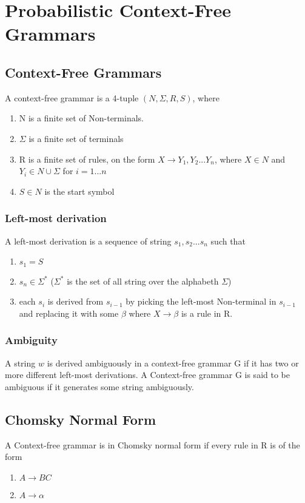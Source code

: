 



\section{Probabilistic Context-Free Grammars}


\subsection{Context-Free Grammars}
A context-free grammar is a 4-tuple $(N, \Sigma, R, S)$, where
\begin{enumerate}
\item N is a finite set of Non-terminals.   
\item $\Sigma$ is a finite set of terminals 
\item R is a finite set of rules, on the form $X \rightarrow Y_1,Y_2 ... Y_n$,
where $X \in N$ and $Y_i \in N \cup \Sigma$ for $i = 1 ... n$
\item $S \in N$ is the start symbol
\end{enumerate}
\cite[p.104]{sipser}
\cite[p.1]{collins}

\subsubsection{Left-most derivation}
A left-most derivation is a sequence of string $s_1, s_2 ... s_n$ such that
\begin{enumerate}
\item $s_1 = S$
\item $s_n \in \Sigma^*$ ($\Sigma^*$ is the set of all string over the alphabeth $\Sigma$)
\item each $s_i$ is derived from $s_{i-1}$ by picking the left-most Non-terminal in $s_{i-1}$ and replacing it with some $\beta$ where $X \rightarrow \beta$  is a rule in R.
\end{enumerate} 
\cite[p.2]{collins}

\subsubsection{Ambiguity}
A string $w$ is derived ambiguously in a context-free grammar G if it has two or
more different left-most derivations.
A Context-free grammar G is said to be ambiguous if it generates some string ambiguously.
\cite[p.108]{sipser}

\subsection{Chomsky Normal Form}
A Context-free grammar is in Chomsky normal form if every rule in R is of the form
\begin{enumerate}
\item $A \rightarrow BC$
\item $A \rightarrow \alpha$
\end{enumerate}

